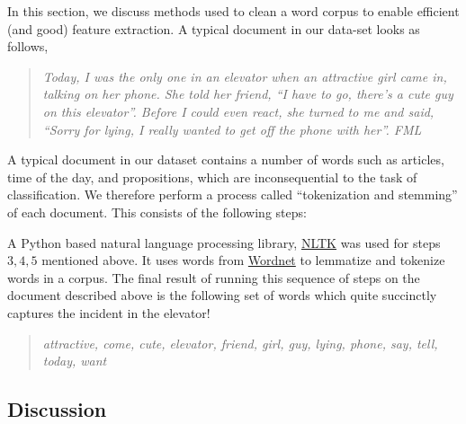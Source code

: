 \documentclass[11pt, letterpaper, conference, final, twocolumn]{ieeeconf}
\begin{document}
In this section, we discuss methods used to clean a word corpus to enable efficient (and good) feature extraction. A typical document in our data-set looks as follows,
\begin{quote}
\small \emph{Today, I was the only one in an elevator when an attractive girl came in, talking on her phone.  She told her friend, ``I have to go, there's a cute guy on this elevator''.  Before I could even react, she turned to me and said, ``Sorry for lying, I really wanted to get off the phone with her''. FML}
\end{quote}
A typical document in our dataset contains a number of words such as articles, time of the day, and propositions, which are inconsequential to the task of classification. We therefore perform a process called ``tokenization and stemming'' of each document. This consists of the following steps:

A Python based natural language processing library, \href{http://www.nltk.org}{NLTK} was used for steps $3,4,5$ mentioned above. It uses words from \href{http://wordnet.princeton.edu}{Wordnet} to lemmatize and tokenize words in a corpus. The final result of running this sequence of steps on the document described above is the following set of words which quite succinctly captures the incident in the elevator!
\begin{quote}
\emph{attractive, come, cute, elevator, friend, girl, guy, lying, phone, say, tell, today, want}
\end{quote}

\subsection{Discussion}
\label{ssec:discussion}
\end{document}
